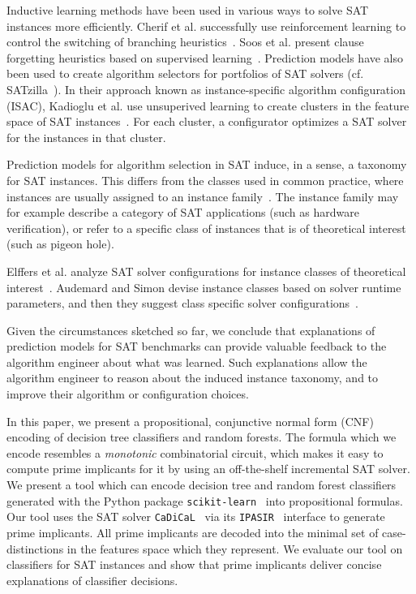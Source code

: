\documentclass[a4paper, USenglish, cleveref, autoref, thm-restate]{lipics-v2021}
\theoremstyle{definition}
\begin{document}
Inductive learning methods have been used in various ways to solve SAT instances more efficiently. 
Cherif et al. successfully use reinforcement learning to control the switching of branching heuristics~\cite{Cherif:2021:KissatMAB}. 
Soos et al. present clause forgetting heuristics based on supervised learning~\cite{Soos:2019:CrystalBall}. 
Prediction models have also been used to create algorithm selectors for portfolios of SAT solvers (cf. SATzilla~\cite{Xu:2008:SATzilla}). 
In their approach known as instance-specific algorithm configuration (ISAC), Kadioglu et al. use unsuperived learning to create clusters in the feature space of SAT instances~\cite{Kadioglu:2010:ISAC}. 
For each cluster, a configurator optimizes a SAT solver for the instances in that cluster. 

Prediction models for algorithm selection in SAT induce, in a sense, a taxonomy for SAT instances. 
This differs from the classes used in common practice, where instances are usually assigned to an instance family~\cite{Froleyks:2021:SC2020}. 
The instance family may for example describe a category of SAT applications (such as \textsf{hardware verification}), or refer to a specific class of instances that is of theoretical interest (such as \textsf{pigeon hole}). 

Elffers et al. analyze SAT solver configurations for instance classes of theoretical interest~\cite{Elffers:2018:Insights}. 
Audemard and Simon devise instance classes based on solver runtime parameters, and then they suggest class specific solver configurations~\cite{Audemard:2016:Extreme}. 

Given the circumstances sketched so far, we conclude that explanations of prediction models for SAT benchmarks can provide valuable feedback to the algorithm engineer about what was learned. 
Such explanations allow the algorithm engineer to reason about the induced instance taxonomy, and to improve their algorithm or configuration choices. 

In this paper, we present a propositional, conjunctive normal form (CNF) encoding of decision tree classifiers and random forests. 
The formula which we encode resembles a \emph{monotonic} combinatorial circuit, which makes it easy to compute prime implicants for it by using an off-the-shelf incremental SAT solver. 
We present a tool which can encode decision tree and random forest classifiers generated with the Python package \verb!scikit-learn!~\cite{Pedregosa:2011:Scikit} into propositional formulas. 
Our tool uses the SAT solver \verb!CaDiCaL!~\cite{Biere:2020:Cadical} via its \verb!IPASIR!~\cite{Balyo:2016:Ipasir} interface to generate prime implicants. 
All prime implicants are decoded into the minimal set of case-distinctions in the features space which they represent. 
We evaluate our tool on classifiers for SAT instances and show that prime implicants deliver concise explanations of classifier decisions. 
\end{document}
